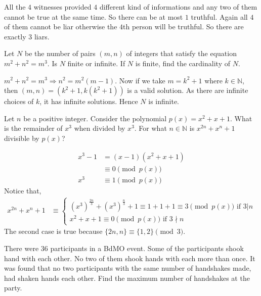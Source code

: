 \documentclass{subfile}
\begin{document}
		\begin{solution} All the $4$ witnesses provided $4$ different kind of informations and any two of them cannot be true at the same time. So there can be at most $1$ truthful. Again all $4$ of them cannot be liar otherwise the $4$th person will be truthful. So there are exactly $3$ liars.

		\end{solution}

		\begin{problem}
			Let $N$ be the number of pairs $(m,n)$ of integers that satisfy the equation $m^2+n^2=m^3$. Is $N$ finite or infinite. If $N$ is finite, find the cardinality of $N$.
		\end{problem}
		\begin{solution}
			$m^2+n^2=m^3 \Longrightarrow n^2=m^2(m-1)$. Now if we take $m=k^2+1$ where $k\in \mathbb{N}$, then $(m,n)=(k^2+1,k(k^2+1))$ is a valid solution. As there are infinite choices of $k$, it has infinite solutions. Hence $N$ is infinite.
		\end{solution}

		\begin{problem}
			Let $n$ be a positive integer. Consider the polynomial $p(x)=x^2+x+1$. What is the remainder of $x^3$ when divided by $x^3$. For what $n\in \mathbb{N}$ is $x^{2n}+x^n+1$ divisible by $p(x)$?
		\end{problem}
		\begin{solution}
			\begin{align*}
				x^3-1 & =(x-1)(x^2+x+1)\\
					  & \equiv 0 \pmod{p(x)}\\
				x^3	  & \equiv 1\pmod{p(x)}
			\end{align*}
			Notice that,
				\begin{align*}
					x^{2n}+x^n+1
					&	\equiv
						\begin{cases}
							\left(x^3\right)^{\frac{2n}{3}}+\left(x^3\right)^{\frac{n}{3}}+1 \equiv 1+1+1 \equiv 3\pmod{p(x)}
							\text{ if }3|n\\
							x^2+x+1\equiv0\pmod{p(x)}\text{ if }3\nmid n
						\end{cases}
				\end{align*}
			The second case is true because $\{2n,n\}\equiv\{1,2\}\pmod 3$.
		\end{solution}

		\begin{problem}
			There were $36$ participants in a BdMO event. Some of the participants shook hand with each other. No two of them shook hands with each more than once. It was found that no two participants with the same number of handshakes made, had shaken hands each other. Find the maximum number of handshakes at the party.
		\end{problem}
\end{document}
